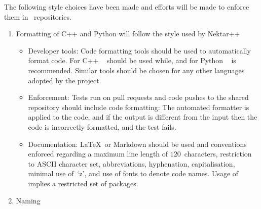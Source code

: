 The following style choices have been made and efforts will be made to enforce them
in \nep \ repositories.
\begin{enumerate}
\item Formatting of C++ and Python will follow the style used by Nektar++
\begin{itemize}
\item Developer tools: Code formatting tools should be used to
automatically format code.  For C++ ~\cite{clang-tidywebsite}
should  be used while, and for Python ~\cite{blackwebsite}
is recommended. Similar tools should be chosen
for any other languages adopted by the project.

\item Enforcement: Tests run on pull requests and code pushes to the
shared repository should include code formatting: The automated
formatter is applied to the code, and if the output is different
from the input then the code is incorrectly formatted, and the test
fails.

\item Documentation: \LaTeX \ or Markdown should be used
and conventions enforced regarding a maximum line length of $120$~characters,
restriction to ASCII character set, abbreviations, hyphenation,
capitalisation, minimal use of~`z', and use of fonts to denote code names.
Usage of  implies a restricted set of packages.

\end{itemize}

\item Naming 


\end{enumerate}
